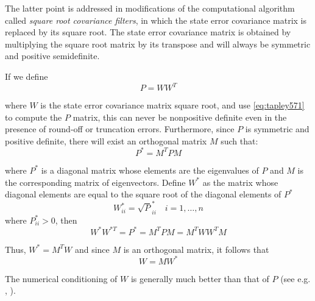 The latter point is addressed in modifications of the computational algorithm called
\emph{square root covariance filters}, in which the state error covariance matrix is
replaced by its square root. The state error covariance matrix is obtained by
multiplying the square root matrix by its transpose and will always be symmetric
and positive semidefinite.

If we define
\begin{equation}
	\label{eq:tapley571}
	P = W W^T
\end{equation}

where \(W\) is the state error covariance matrix square root, and use \ref{eq:tapley571} to
compute the \(P\) matrix, this can never be nonpositive definite even in the presence
of round-off or truncation errors. Furthermore, since \(P\) is symmetric and positive
definite, there will exist an orthogonal matrix \(M\) such that:
\begin{equation}
	\label{eq:tapley572}
	P^* = M^T P M
\end{equation}

where \(P^*\) is a diagonal matrix whose elements are the eigenvalues of \(P\) and
\(M\) is the corresponding matrix of eigenvectors. Define \(W^*\) as the matrix
whose diagonal elements are equal to the square root of the diagonal elements of \(P^*\)
\begin{equation}
	W^*_{ii} = \sqrt P^*_{ii} \quad i=1,\ldots ,n
\end{equation}
where \(P^*_{ii} > 0\), then
\begin{equation}
	W^* W^{*T} = P^* = M^T P M = M^T W W^T M
\end{equation}

Thus, \(W^* = M^T W \) and since \(M\) is an orthogonal matrix, it follows that
\begin{equation}
	\label{eq:tapley574}
	W = M W^*
\end{equation}

The numerical conditioning of \(W\) is generally much better than that of \(P\) (see
e.g. \cite{lawson1995}, \cite{tapley}).
